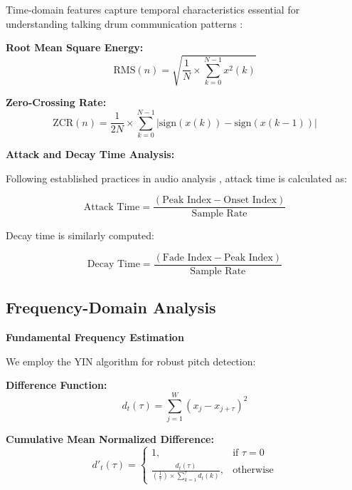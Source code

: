 \documentclass[12pt,a4paper]{article}
\begin{document}
Time-domain features capture temporal characteristics essential for understanding talking drum communication patterns \citep{mcaulay1986speech, quatieri2002discrete}:

\textbf{Root Mean Square Energy:}
\begin{equation}
\text{RMS}(n) = \sqrt{\frac{1}{N} \times \sum_{k=0}^{N-1} x^2(k)}
\end{equation}

\textbf{Zero-Crossing Rate:}
\begin{equation}
\text{ZCR}(n) = \frac{1}{2N} \times \sum_{k=0}^{N-1} |\text{sign}(x(k)) - \text{sign}(x(k-1))|
\end{equation}

\textbf{Attack and Decay Time Analysis:}

Following established practices in audio analysis \citep{peeters2004large}, attack time is calculated as:

\begin{equation}
\text{Attack Time} = \frac{(\text{Peak Index} - \text{Onset Index})}{\text{Sample Rate}}
\end{equation}

Decay time is similarly computed:

\begin{equation}
\text{Decay Time} = \frac{(\text{Fade Index} - \text{Peak Index})}{\text{Sample Rate}}
\end{equation}

\subsection{Frequency-Domain Analysis}

\textbf{Fundamental Frequency Estimation}

We employ the YIN algorithm \citep{de2002yin} for robust pitch detection:

\textbf{Difference Function:}
\begin{equation}
d_t(\tau) = \sum_{j=1}^W (x_j - x_{j+\tau})^2
\end{equation}

\textbf{Cumulative Mean Normalized Difference:}
\begin{equation}
d'_t(\tau) = \begin{cases}
1, & \text{if } \tau = 0 \\
\frac{d_t(\tau)}{\left(\frac{1}{\tau}\right) \times \sum_{k=1}^\tau d_t(k)}, & \text{otherwise}
\end{cases}
\end{equation}
\end{document}

